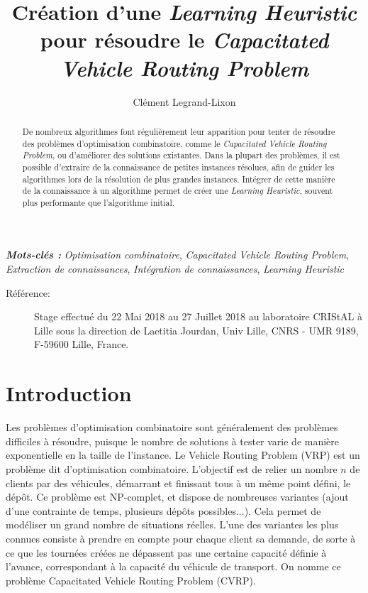 \documentclass[a4paper,11pt]{article}%
\providecommand{\keywords}[1]{\textbf{\textit{Mots-clés : }} #1}
\begin{document}
\title{Création d'une \emph{Learning Heuristic} pour résoudre le \emph{Capacitated Vehicle Routing Problem}}

\author{Clément Legrand-Lixon}

\maketitle

\begin{abstract}
De nombreux algorithmes font régulièrement leur apparition pour tenter de résoudre des problèmes d'optimisation combinatoire, comme le \emph{Capacitated Vehicle Routing Problem}, ou d'améliorer des solutions existantes.
Dans la plupart des problèmes, il est possible d'extraire de la connaissance de petites instances résolues, afin de guider les algorithmes lors de la résolution de plus grandes instances. Intégrer de cette manière de la connaissance à un algorithme permet de créer une \emph{Learning Heuristic}, souvent plus performante que l'algorithme initial. 
\end{abstract}

\keywords{\emph{Optimisation combinatoire}, \emph{Capacitated Vehicle Routing Problem}, \emph{Extraction de connaissances}, \emph{Intégration de connaissances}, \emph{Learning Heuristic}}

\begin{description}
\item[Référence:] Stage effectué du 22 Mai 2018 au 27 Juillet 2018 au laboratoire CRIStAL à Lille sous la direction de Laetitia Jourdan, Univ Lille, CNRS - UMR 9189, F-59600 Lille, France.

\end{description}

\section*{Introduction}

Les problèmes d'optimisation combinatoire sont généralement des problèmes difficiles à résoudre, puisque le nombre de solutions à tester varie de manière exponentielle en la taille de l'instance. 
Le Vehicle Routing Problem (VRP) est un problème dit d'optimisation combinatoire.
L'objectif est de relier un nombre $n$ de clients par des véhicules, démarrant et finissant tous à un même point défini, le dépôt. 
Ce problème est NP-complet, et dispose de nombreuses variantes (ajout d'une contrainte de temps, plusieurs dépôts possibles...). Cela permet de modéliser un grand nombre de situations réelles. 
L'une des variantes les plus connues consiste à prendre en compte pour chaque client sa demande, de sorte à ce que les tournées créées ne dépassent pas une certaine capacité définie à l'avance, correspondant à la capacité du véhicule de transport. 
On nomme ce problème Capacitated Vehicle Routing Problem (CVRP). 
\end{document}
